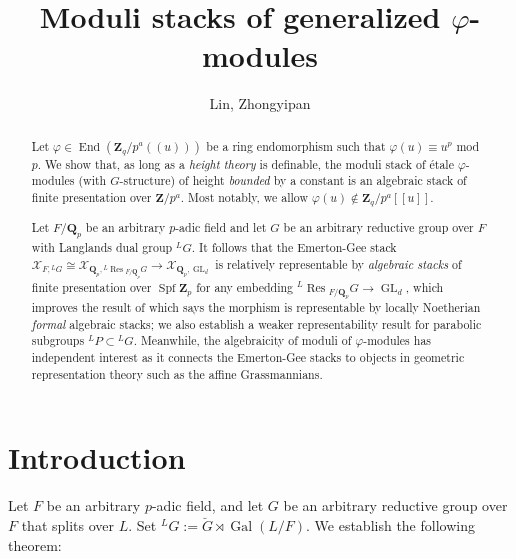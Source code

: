 \documentclass[11pt]{amsart}
\numberwithin{thm}{section}
\numberwithin{lem}{section}
\numberwithin{cor}{section}
\numberwithin{prop}{section}
\numberwithin{exam}{section}
\numberwithin{dfn}{section}
\newcommand{\End}{\operatorname{End}}
\newcommand{\Gal}{\operatorname{Gal}}
\newcommand{\Res}{\operatorname{Res}}
\newcommand{\GL}{\operatorname{GL}}
\newcommand{\spf}{\operatorname{Spf}}
\newcommand{\cX}{\mathcal{X}}
\newcommand{\bG}{\breve{G}}
\newcommand{\Z}{\mathbf{Z}}
\newcommand{\Q}{\mathbf{Q}}
\newcommand{\lsup}[2]{{^{#1}\!#2}}
\begin{document}
\author{Lin, Zhongyipan}
\title{Moduli stacks of generalized $\varphi$-modules}

\begin{abstract}
Let $\varphi\in \End(\Z_q/p^a(\!(u)\!))$
be a ring endomorphism such that
$\varphi(u)\equiv u^{p}$ mod $p$.
We show that,
as long as a {\it height theory} is definable,
the moduli stack
of \'etale $\varphi$-modules
(with $G$-structure)
of height {\it bounded} by a constant
is an algebraic stack of finite presentation
over $\Z/p^a$.
Most notably, we allow
$\varphi(u)\notin \Z_q/p^a[\![u]\!]$.

Let $F/\Q_p$ be an arbitrary $p$-adic field
and let $G$ be an arbitrary reductive group over $F$
with Langlands dual group $\lsup LG$.
It follows that the Emerton-Gee stack
$\cX_{F,\lsup LG}\cong\cX_{\Q_p,\lsup L\Res_{F/\Q_p}G}
\to\cX_{\Q_p, \GL_d}$
is relatively representable by {\it algebraic stacks}
of finite presentation over $\spf \Z_p$
for any embedding $\lsup L\Res_{F/\Q_p}G
\to\GL_d$,
which improves the result of \cite{Min25}
which says the morphism is representable by
locally Noetherian
{\it formal} algebraic stacks;
we also establish
a weaker representability result 
for parabolic subgroups $\lsup LP\subset\lsup LG$.
Meanwhile, the algebraicity
of moduli of $\varphi$-modules
has independent interest as
it connects the Emerton-Gee stacks
to objects in geometric representation theory
such as the affine Grassmannians.
\end{abstract}

\maketitle

\tableofcontents

\section{Introduction}

Let $F$ be an arbitrary $p$-adic field,
and let $G$ be an arbitrary reductive group
over $F$ that splits over $L$.
Set $\lsup LG:=\bG\rtimes\Gal(L/F)$.
We establish the following theorem:
\end{document}
